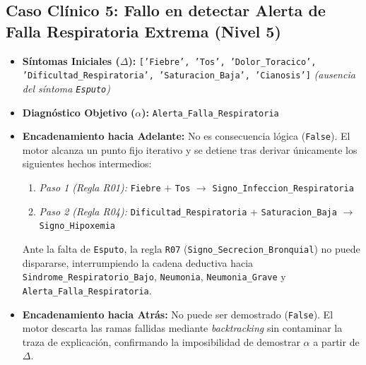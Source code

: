 \documentclass[11pt,a4paper]{article}
\begin{document}
\subsection{Caso Clínico 5: Fallo en detectar Alerta de Falla Respiratoria Extrema (Nivel 5)}
\begin{itemize}
    \item \textbf{Síntomas Iniciales ($\Delta$):} \texttt{['Fiebre', 'Tos', 'Dolor\_Toracico', \\'Dificultad\_Respiratoria', 'Saturacion\_Baja', 'Cianosis']} \textit{(ausencia del síntoma \texttt{Esputo})}
    \item \textbf{Diagnóstico Objetivo ($\alpha$):} \texttt{Alerta\_Falla\_Respiratoria}
    \item \textbf{Encadenamiento hacia Adelante:} No es consecuencia lógica (\texttt{False}). El motor alcanza un punto fijo iterativo y se detiene tras derivar únicamente los siguientes hechos intermedios:
    \begin{enumerate}
        \item \textit{Paso 1 (Regla R01):} \texttt{Fiebre} + \texttt{Tos} $\rightarrow$ \texttt{Signo\_Infeccion\_Respiratoria}
        \item \textit{Paso 2 (Regla R04):} \texttt{Dificultad\_Respiratoria} + \texttt{Saturacion\_Baja} $\rightarrow$ \texttt{Signo\_Hipoxemia}
    \end{enumerate}
    Ante la falta de \texttt{Esputo}, la regla \texttt{R07} (\texttt{Signo\_Secrecion\_Bronquial}) no puede dispararse, interrumpiendo la cadena deductiva hacia \texttt{Sindrome\_Respiratorio\_Bajo}, \texttt{Neumonia}, \texttt{Neumonia\_Grave} y \texttt{Alerta\_Falla\_Respiratoria}.
    \item \textbf{Encadenamiento hacia Atrás:} No puede ser demostrado (\texttt{False}). El motor descarta las ramas fallidas mediante \textit{backtracking} sin contaminar la traza de explicación, confirmando la imposibilidad de demostrar $\alpha$ a partir de $\Delta$.
\end{itemize}
\end{document}

